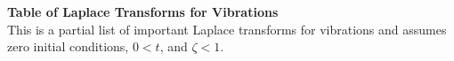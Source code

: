 \documentclass[12pt,letter]{article}
\begin{document}
					
\pagebreak			
			\pagestyle{empty}
			\vspace{-25ex}
			\begin{center}
			{\large{}\textbf{Table of Laplace Transforms for Vibrations}} \\
			\normalsize{} This is a partial list of important Laplace transforms for vibrations and assumes \\ zero initial conditions, $0 < t$, and $\zeta < 1$.
			\end{center}
			
			\vspace{0ex}
\end{document}
